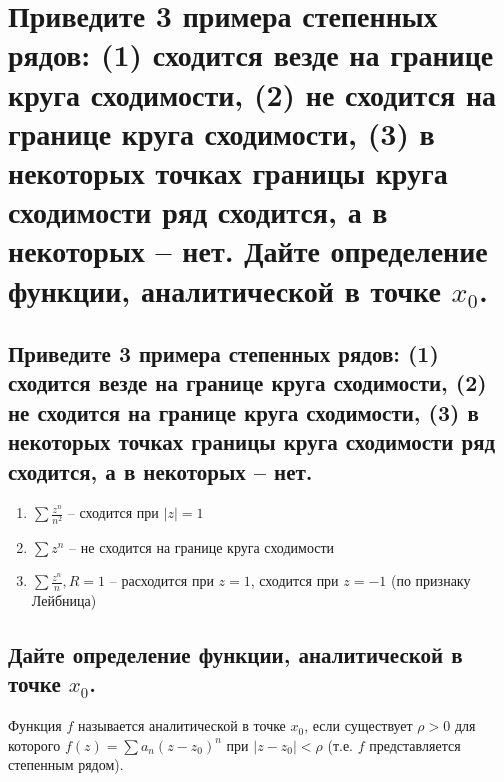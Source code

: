 \section{Приведите 3 примера степенных рядов: (1) сходится везде на границе круга сходимости, (2) не сходится на границе круга сходимости, (3) в некоторых точках границы круга сходимости ряд сходится, а в некоторых -- нет. Дайте определение функции, аналитической в точке $x_0$.}

\subsection{Приведите 3 примера степенных рядов: (1) сходится везде на границе круга сходимости, (2) не сходится на границе круга сходимости, (3) в некоторых точках границы круга сходимости ряд сходится, а в некоторых -- нет.}
\begin{enumerate}
    \item $\sum \frac{z^n}{n^2}$ -- сходится при $|z| = 1$
    \item $\sum z^n$ -- не сходится на границе круга сходимости 
    \item $\sum \frac{z^n}{n}, R = 1$ -- расходится при $z = 1$, сходится при $z = -1$ (по признаку Лейбница)
\end{enumerate}

\subsection{Дайте определение функции, аналитической в точке $x_0$.}
\begin{definition}
    Функция $f$ называется аналитической в точке $x_0$, если существует $\rho > 0$ для которого $f(z) = \sum a_n (z-z_0)^n$ при $|z - z_0| < \rho$ (т.е. $f$ представляется степенным рядом).
\end{definition}